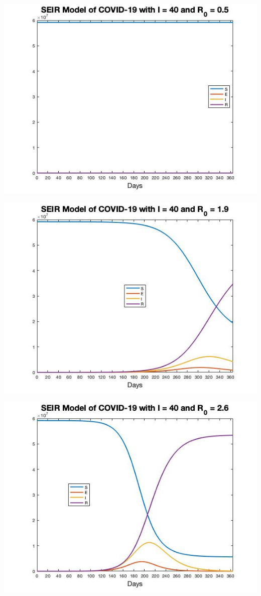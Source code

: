 \documentclass[12pt, a4paper]{article}
\begin{document}
    \includegraphics[scale=0.75]{plots/seir40(0.5).jpg}
        
        
    \includegraphics[scale=0.75]{plots/seir40(1.9).jpg}
        
    \includegraphics[scale=0.75]{plots/seir40(2.6).jpg}
        
\end{document}
